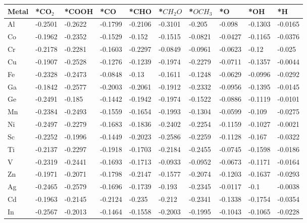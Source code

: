 \begin{table}[h]
  \centering
  {\fontsize{6}{12}\selectfont
  \begin{tabular}{*{10}{l}}
      \hline
      Metal & *CO$_2$ & *COOH & *CO & *CHO & *$CH_2O$ & *$OCH_3$ & *O & *OH & *H                   \\
      \hline
      Al & -0.2501 & -0.2622 & -0.1799 & -0.2106 & -0.3101 & -0.205  & -0.098  & -0.1303 & -0.0165 \\
      Co & -0.1962 & -0.2352 & -0.1529 & -0.152  & -0.1515 & -0.0821 & -0.0427 & -0.1165 & -0.0376 \\
      Cr & -0.2178 & -0.2281 & -0.1603 & -0.2297 & -0.0849 & -0.0961 & -0.0623 & -0.12   & -0.025  \\
      Cu & -0.1907 & -0.2528 & -0.1276 & -0.1239 & -0.1974 & -0.2279 & -0.0711 & -0.1357 & -0.0044 \\
      Fe & -0.2328 & -0.2473 & -0.0848 & -0.13   & -0.1611 & -0.1248 & -0.0629 & -0.0996 & -0.0292 \\
      Ga & -0.1842 & -0.2577 & -0.2003 & -0.2061 & -0.1912 & -0.2332 & -0.0956 & -0.1395 & -0.0145 \\
      Ge & -0.2491 & -0.185  & -0.1442 & -0.1942 & -0.1974 & -0.1522 & -0.0886 & -0.1119 & -0.0101 \\
      Mn & -0.2384 & -0.2493 & -0.1559 & -0.1654 & -0.1993 & -0.1304 & -0.0599 & -0.109  & -0.0275 \\
      Ni & -0.2497 & -0.2279 & -0.1683 & -0.1836 & -0.2402 & -0.2254 & -0.1159 & -0.1027 & -0.0021 \\
      Sc & -0.2252 & -0.1996 & -0.1449 & -0.2023 & -0.2586 & -0.2259 & -0.1128 & -0.167  & -0.0322 \\
      Ti & -0.2137 & -0.2297 & -0.1918 & -0.1703 & -0.2184 & -0.2455 & -0.0745 & -0.1598 & -0.0186 \\
      V  & -0.2319 & -0.2441 & -0.1693 & -0.1713 & -0.0933 & -0.0952 & -0.0673 & -0.1171 & -0.0164 \\
      Zn & -0.1971 & -0.2071 & -0.1798 & -0.2147 & -0.1577 & -0.2074 & -0.1203 & -0.1637 & -0.0293 \\
      Ag & -0.2465 & -0.2579 & -0.1696 & -0.1739 & -0.193  & -0.2345 & -0.0117 & -0.1    & -0.0038 \\
      Cd & -0.1963 & -0.2145 & -0.2124 & -0.235  & -0.212  & -0.2341 & -0.1338 & -0.1754 & -0.0354 \\
      In & -0.2567 & -0.2013 & -0.1464 & -0.1558 & -0.2003 & -0.1995 & -0.1043 & -0.1065 & -0.0228 \\

\end{tabular}}
\end{table}
